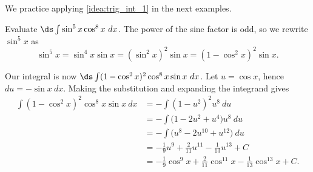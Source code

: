 We practice applying \autoref{idea:trig_int_1} in the next examples.

\begin{example}\label{ex_trigint1}
Evaluate $\ds\int\sin^5x\cos^8x\ dx$.
\solution
The power of the sine factor is odd, so we rewrite $\sin^5x$ as
\[\sin^5x = \sin^4x\sin x = (\sin^2x)^2\sin x = (1-\cos^2x)^2\sin x.\]

Our integral is now $\ds \int (1-\cos^2x)^2\cos^8x\sin x\ dx$. Let $u = \cos x$, hence $du = -\sin x\ dx$. Making the substitution and expanding the integrand gives
\begin{align*}
 \int (1-\cos^2x)^2\cos^8x\sin x\ dx
 &= -\int (1-u^2)^2u^8\ du \\
 &= -\int \bigl(1-2u^2+u^4\bigr)u^8\ du \\
 &= -\int \bigl(u^8-2u^{10}+u^{12}\bigr)\ du \\
 &= -\frac19u^9 + \frac2{11}u^{11} - \frac1{13}u^{13} + C \\
 &=-\frac19\cos^9 x + \frac2{11}\cos^{11} x - \frac1{13}\cos^{13} x + C.
\end{align*}
\end{example}

